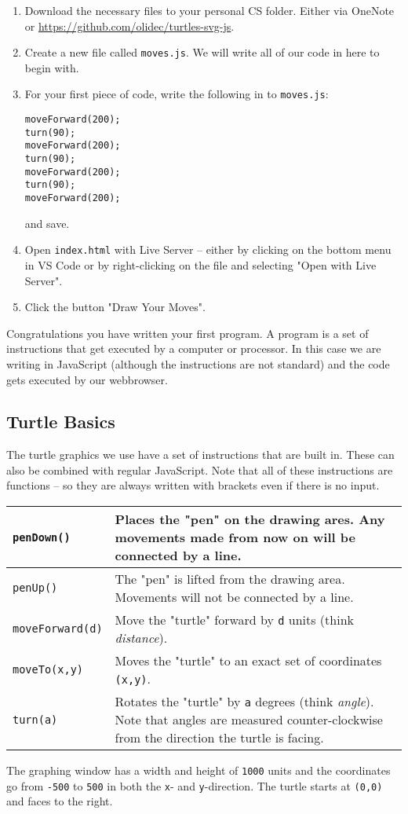 \documentclass[11pt,a4paper]{report}
\begin{document}
\begin{enumerate}
\item Download the necessary files to your personal CS folder. Either via OneNote or \url{https://github.com/olidec/turtles-svg-js}.
\item Create a new file called \verb|moves.js|. We will write all of our code in here to begin with.
\item For your first piece of code, write the following in to \verb|moves.js|:
\begin{verbatim}
moveForward(200);
turn(90);
moveForward(200);
turn(90);
moveForward(200);
turn(90);
moveForward(200);
\end{verbatim}
and save.
\item Open \verb|index.html| with Live Server -- either by clicking on the bottom menu in VS Code or by right-clicking on the file and selecting "Open with Live Server".
\item Click the button "Draw Your Moves".
\end{enumerate}

Congratulations you have written your first program. A program is a set of instructions that get executed by a computer or processor. In this case we are writing in JavaScript (although the instructions are not standard) and the code gets executed by our webbrowser.

\subsection{Turtle Basics}

The turtle graphics we use have a set of instructions that are built in. These can also be combined with regular JavaScript. Note that all of these instructions are functions -- so they are always written with brackets even if there is no input.
\renewcommand{\arraystretch}{1.5}
\begin{center}
\begin{tabular}{p{3cm}|p{8cm}}
\verb|penDown()| & Places the "pen" on the drawing ares. Any movements made from now on will be connected by a line. \\
\hline
\verb|penUp()| & The "pen" is lifted from the drawing area. Movements will not be connected by a line.  \\
\hline
\verb|moveForward(d)| & Move the "turtle" forward by \verb|d| units (think \emph{distance}).  \\
\hline
\verb|moveTo(x,y)| & Moves the "turtle" to an exact set of coordinates \verb|(x,y)|. \\
\hline
\verb|turn(a)| & Rotates the "turtle" by \verb|a| degrees (think \emph{angle}). Note that angles are measured counter-clockwise from the direction the turtle is facing. 
\end{tabular}
\end{center}
The graphing window has a width and height of \verb|1000| units and the coordinates go from \verb|-500| to \verb|500| in both  the \verb|x|- and \verb|y|-direction. The turtle starts at \verb|(0,0)| and faces to the right.
\end{document}
